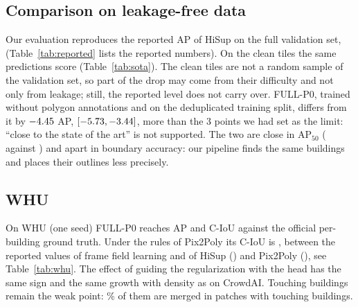 \documentclass[conference]{IEEEtran}
\newcommand{\fittable}[1]{\resizebox{\ifdim\width>\textwidth\textwidth\else\width\fi}{!}{#1}}
\begin{document}
\subsection{Comparison on leakage-free data}
\begin{table}[t]
\centering
\caption{HiSup, evaluated from its released predictions, and our final model on the \NTilesClean{} validation tiles
without a duplicate in the training set. Same evaluation code for both.}
\label{tab:sota}
\resizebox{\textwidth}{!}{}
\end{table}
\begin{table}[t]
\centering
\caption{Numbers \emph{reported in the cited papers} on the full CrowdAI validation set, which leaks from the training
set. They are not comparable with Tables~\ref{tab:ablation} and~\ref{tab:sota}.}
\label{tab:reported}
\footnotesize\fittable{}
\end{table}
Our evaluation reproduces the reported AP of HiSup on the full validation set, \NLeakyApHisup{}
(Table~\ref{tab:reported} lists the reported numbers). On the clean tiles the same predictions score \NCleanApHisup{}
(Table~\ref{tab:sota}). The clean tiles are not a random sample of the validation set, so part of the drop may come from
their difficulty and not only from leakage; still, the reported level does not carry over. FULL-P0, trained without
polygon annotations and on the deduplicated training split, differs from it by $-4.45$ AP, $[-5.73, -3.44]$, more than
the 3 points we had set as the limit: ``close to the state of the art'' is not supported. The two are close in
AP$_{50}$ (\NCleanApfiftyFull{} against \NCleanApfiftyHisup) and apart in boundary accuracy: our pipeline finds the same
buildings and places their outlines less precisely.

\subsection{WHU}
\begin{table}[t]
\centering
\caption{WHU test patches under the rules of Pix2Poly. $^\dagger$Reported in~\cite{adimoolam2025pix2poly}; their test
tiles are not exactly ours, so the comparison is approximate.}
\label{tab:whu}
\footnotesize\fittable{}
\end{table}
On WHU (one seed) FULL-P0 reaches \NWhuAp{} AP and \NWhuCiouMain{} C-IoU against the official per-building ground
truth. Under the rules of Pix2Poly its C-IoU is \NWhuCiou, between the reported values of frame field learning and of
HiSup (\NWhuCiouHisup) and Pix2Poly (\NWhuCiouPixtopoly), see Table~\ref{tab:whu}. The effect of guiding the
regularization with the head has the same sign and the same growth with density as on CrowdAI. Touching buildings remain
the weak point: \NWhuMergeTouching\% of them are merged in patches with touching buildings.
\end{document}
